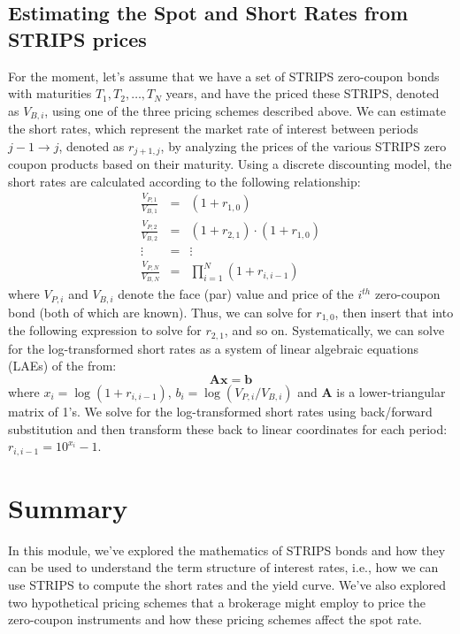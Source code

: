 \documentclass[11pt]{article}
\theoremstyle{definition}
\begin{document}
\subsection*{Estimating the Spot and Short Rates from STRIPS prices}
For the moment, let's assume that we have a set of STRIPS zero-coupon bonds with maturities $T_{1}, T_{2},\ldots, T_{N}$ years, 
and have the priced these STRIPS, denoted as $V_{B, i}$, using one of the three pricing schemes described above.
We can estimate the short rates, which represent the market rate of interest between periods $j-1\rightarrow{j}$, denoted as $r_{j+1,j}$, by analyzing the prices of the various STRIPS zero coupon products based on their maturity. Using a discrete discounting model, the short rates are calculated according to the following relationship:
\begin{eqnarray}
\frac{V_{P,1}}{V_{B,1}} & = & \left(1+r_{1,0}\right) \\
\frac{V_{P,2}}{V_{B,2}} & = & \left(1+r_{2,1}\right)\cdot\left(1+r_{1,0}\right) \\
\vdots & = & \vdots \\
\frac{V_{P,N}}{V_{B,N}} & = & \prod_{i=1}^{N}\left(1+r_{i,i-1}\right)
\end{eqnarray}
where $V_{P, i}$ and $V_{B, i}$ denote the face (par) value and price of the $i^{th}$ zero-coupon bond (both of which are known). Thus, we can solve for $r_{1,0}$, then insert that into the following expression to solve for $r_{2,1}$, and so on. Systematically, we can solve for the log-transformed short rates as a system of linear algebraic equations (LAEs) of the from:
\begin{equation}
\mathbf{A}\mathbf{x} = \mathbf{b}
\end{equation}
where $x_{i} = \log\left(1+r_{i,i-1}\right)$, $b_{i} = \log\left(V_{P,i}/V_{B,i}\right)$ and $\mathbf{A}$ is a lower-triangular matrix of 1's. We solve for the log-transformed short rates using back/forward substitution
and then transform these back to linear coordinates for each period: $r_{i,i-1} = 10^{x_{i}} - 1$.

\section*{Summary}
In this module, we've explored the mathematics of STRIPS bonds and how they can be used to understand the term structure of interest rates, i.e., how we can use STRIPS to compute the short rates and the yield curve. We've also explored two hypothetical pricing schemes that a brokerage might employ to price the zero-coupon instruments and how these pricing schemes affect the spot rate. 
\end{document}
